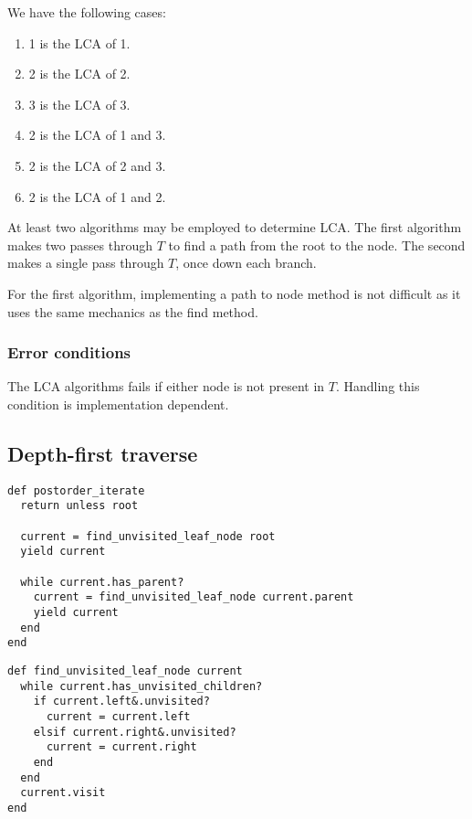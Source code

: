 \documentclass{article}
\begin{document}

We have the following cases:

\begin{enumerate}
  \item 1 is the LCA of 1.
  \item 2 is the LCA of 2.
  \item 3 is the LCA of 3.
  \item 2 is the LCA of 1 and 3.
  \item 2 is the LCA of 2 and 3.
  \item 2 is the LCA of 1 and 2.
\end{enumerate}

At least two algorithms may be employed to determine LCA. The first algorithm makes
two passes through $T$ to find a path from the root to the node. The second makes a
single pass through $T$, once down each branch.

For the first algorithm, implementing a path to node method is not difficult as
it uses the same mechanics as the find method.

\subsubsection{Error conditions}

The LCA algorithms fails if either node is not present in $T$. Handling this
condition is implementation dependent.


\subsection{Depth-first traverse}

\begin{lstlisting}[frame=single,title=Traverse the tree from the bottom up.]
def postorder_iterate
  return unless root

  current = find_unvisited_leaf_node root
  yield current

  while current.has_parent?
    current = find_unvisited_leaf_node current.parent
    yield current
  end
end
\end{lstlisting}

\begin{lstlisting}[frame=single,title=Find the deepest leftmost unvisited node relative to current.]
def find_unvisited_leaf_node current
  while current.has_unvisited_children?
    if current.left&.unvisited?
      current = current.left
    elsif current.right&.unvisited?
      current = current.right
    end
  end
  current.visit
end
\end{lstlisting}
\end{document}
